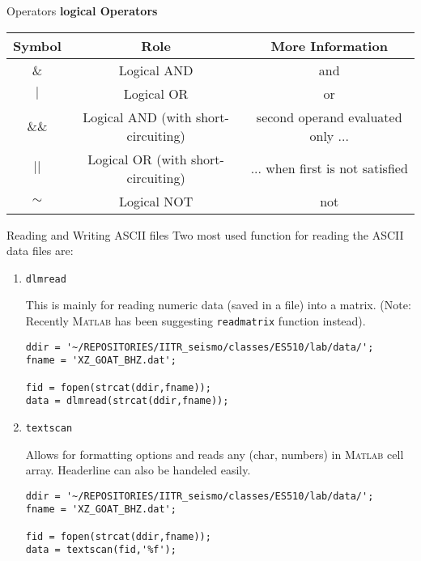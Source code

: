 \documentclass[11pt,titlepage,fleqn]{article}
\newcommand{\matlab}{\textsc{Matlab}\xspace}
\begin{document}
\begin{section}{Operators}
{\bf logical Operators}
\begin{tabular}{|c|c|c|}
\hline
Symbol  &	Role  &	More Information \\
\hline
\& &	Logical AND &	and\\
$|$ &	Logical OR  &	or\\
\&\& &	Logical AND (with short-circuiting) & second operand evaluated only ...\\
$||$ &	Logical OR (with short-circuiting)  & ... when first is not satisfied\\
$\sim$ &	Logical NOT &	not\\
\hline
\end{tabular}
\end{section}

\begin{section}{Reading and Writing ASCII files}
Two most used function for reading the ASCII data files are:
\begin{enumerate}
\item \verb+dlmread+

This is mainly for reading numeric data (saved in a file) into a matrix.
(Note: Recently \matlab has been suggesting \verb+readmatrix+ function instead).

\begin{verbatim}
ddir = '~/REPOSITORIES/IITR_seismo/classes/ES510/lab/data/';
fname = 'XZ_GOAT_BHZ.dat';
    
fid = fopen(strcat(ddir,fname));
data = dlmread(strcat(ddir,fname));
\end{verbatim}
\item \verb+textscan+ 

Allows for formatting options and reads any (char, numbers) in \matlab cell array. Headerline can also be handeled easily.

\begin{verbatim}
ddir = '~/REPOSITORIES/IITR_seismo/classes/ES510/lab/data/';
fname = 'XZ_GOAT_BHZ.dat';
    
fid = fopen(strcat(ddir,fname));
data = textscan(fid,'%f');
\end{verbatim}
\end{enumerate}
\end{section}


\end{document}
